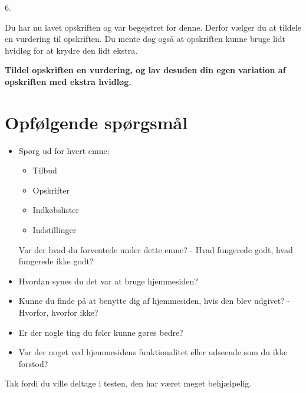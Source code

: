 6. 

Du har nu lavet opskriften og var begejstret for denne. Derfor vælger du at tildele en vurdering til opskriften.
Du mente dog også at opskriften kunne bruge lidt hvidløg for at krydre den lidt ekstra. 

\textbf{Tildel opskriften en vurdering, og lav desuden din egen variation af opskriften med ekstra hvidløg.}


\section{Opfølgende spørgsmål}

\begin{itemize}
	\item Spørg ud for hvert emne:
		\begin{itemize}
			\item Tilbud
			\item Opskrifter
			\item Indkøbslister
			\item Indstillinger
		\end{itemize}
	Var der hvad du forventede under dette emne? - Hvad fungerede godt, hvad fungerede ikke godt?
	\item Hvordan synes du det var at bruge hjemmesiden?
	\item Kunne du finde på at benytte dig af hjemmesiden, hvis den blev udgivet? - Hvorfor, hvorfor ikke?
	\item Er der nogle ting du føler kunne gøres bedre?
	\item Var der noget ved hjemmesidens funktionalitet eller udseende som du ikke forstod?
\end{itemize}

Tak fordi du ville deltage i testen, den har været meget behjælpelig.
